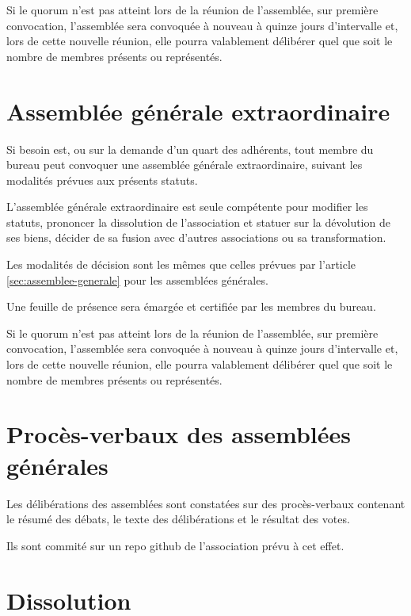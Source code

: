 \documentclass[12 pt]{article}
\begin{document}
Si le quorum n'est pas atteint lors de la réunion de l'assemblée, sur
première convocation, l'assemblée sera convoquée à nouveau à quinze
jours d'intervalle et, lors de cette nouvelle réunion, elle pourra
valablement délibérer quel que soit le nombre de membres présents ou
représentés.


\section{Assemblée générale extraordinaire}
\label{sec:assemblee-generale-extraordinaire}

Si besoin est, ou sur la demande d’un quart des adhérents, tout membre
du bureau peut convoquer une assemblée générale extraordinaire,
suivant les modalités prévues aux présents statuts.

L'assemblée générale extraordinaire est seule compétente pour modifier
les statuts, prononcer la dissolution de l'association et statuer sur
la dévolution de ses biens, décider de sa fusion avec d'autres
associations ou sa transformation.

Les modalités de décision sont les mêmes que celles prévues par
l'article \ref{sec:assemblee-generale} pour les assemblées générales.

Une feuille de présence sera émargée et certifiée par les membres du bureau.

Si le quorum n'est pas atteint lors de la réunion de l'assemblée, sur
première convocation, l'assemblée sera convoquée à nouveau à quinze
jours d'intervalle et, lors de cette nouvelle réunion, elle pourra
valablement délibérer quel que soit le nombre de membres présents ou
représentés.

\section{Procès-verbaux des assemblées générales}
\label{sec:proces-verbaux-des-assemblees-generales}

Les délibérations des assemblées sont constatées sur des
procès-verbaux contenant le résumé des débats, le texte des
délibérations et le résultat des votes.

Ils sont commité sur un repo github de l'association prévu à cet
effet.


\section{Dissolution}
\label{sec:dissolution}
\end{document}
